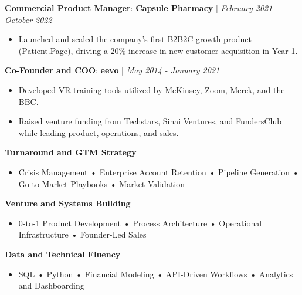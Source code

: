 \documentclass[10pt,a4paper,withhyper]{altacv}
\newcommand{\atscvevent}[4]{%
  \textbf{#1}: \textbf{\textcolor{accent}{#2}} | \textit{#3}%
  \vspace{0.3em}%
}
\begin{document}
\atscvevent{Commercial Product Manager}{Capsule Pharmacy}{February 2021 - October 2022}{}
\begin{itemize}
\item Launched and scaled the company's first B2B2C growth product (Patient.Page), driving a 20\% increase in new customer acquisition in Year 1.
\end{itemize}

\atscvevent{Co-Founder and COO}{eevo}{May 2014 - January 2021}{}
\begin{itemize}
\item Developed VR training tools utilized by McKinsey, Zoom, Merck, and the BBC.
\item Raised venture funding from Techstars, Sinai Ventures, and FundersClub while leading product, operations, and sales.
\end{itemize}




\textbf{Turnaround and GTM Strategy}
\begin{itemize}
\item Crisis Management • Enterprise Account Retention • Pipeline Generation • Go-to-Market Playbooks • Market Validation
\end{itemize}

\textbf{Venture and Systems Building}
\begin{itemize}
\item 0-to-1 Product Development • Process Architecture • Operational Infrastructure • Founder-Led Sales
\end{itemize}

\textbf{Data and Technical Fluency}
\begin{itemize}
\item SQL • Python • Financial Modeling • API-Driven Workflows • Analytics and Dashboarding
\end{itemize}
\end{document}
